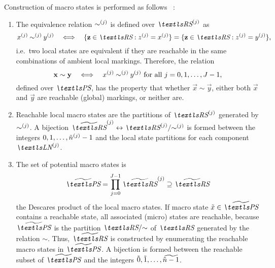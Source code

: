 Construction of macro states is performed as follows%
~\citep{DBLP:journals/tse/Buchholz99}:
\begin{enumerate}
\item The equivalence relation $\sim^{(j)}$ is defined over
  $\loc{\RS}{j}$ as
  \begin{equation}
    \loc{x}{j} \mathbin{\loc{\sim}{j}} \loc{y}{j}
    \quad\Longleftrightarrow\quad \{ \vec{z} \in \RS : \loc{z}{j} =
    \loc{x}{j} \} = \{ \vec{z} \in \RS : \loc{z}{j} = \loc{y}{j} \}
    \text,
  \end{equation}
  i.e.~two local states are equivalent if they are reachable in the
  same combinations of ambient local markings. Therefore, the relation
  \begin{equation}
    \bm{\mathrm{x}} \sim \bm{\mathrm{y}} \quad\Longleftrightarrow\quad x^{(j)}
    \mathbin{\sim^{(j)}} y^{(j)} \text{ for all $j = 0, 1,
      \ldots, J - 1$,}
  \end{equation}
  defined over $\PS$, has the property that whether
  $\vec{x} \sim \vec{y}$, either both $\vec{x}$ and $\vec{y}$ are
  reachable (global) markings, or neither are.
\item Reachable local macro states are the partitions of
  $\loc{\RS}{j}$ generated by $\sim^{(j)}$. A bijection
  $\loc{\Macro{\RS}}{j} \leftrightarrow \loc{\RS}{j} / {\loc{\sim}{j}}$
  is formed between the integers
  $0, 1, \ldots, \tilde{n}^{(j)} - 1$ and the local state
  partitions for each component $\LN{j}$.
\item The set of potential macro states is
  \begin{equation}
    \Macro{\PS} = \prod_{j = 0}^{J - 1} \loc{\Macro{\RS}}{j}
    \supseteq \Macro{\RS}
  \end{equation}
  the Descares product of the local macro states. If macro state
  $\macro{x} \in \Macro{\PS}$ contains a reachable state, all
  associated (micro) states are reachable, because $\Macro{\PS}$ is
  the partition $\RS / {\sim}$ of $\RS$ generated by the relation
  $\sim$. Thus, $\Macro{\RS}$ is constructed by enumerating the
  reachable macro states in $\Macro{\PS}$. A bijection is formed
  between the reachable subset of $\Macro{\PS}$ and the integers
  $\tilde{0}, \tilde{1}, \ldots, \widetilde{\tilde{n} - 1}$.
\end{enumerate}

